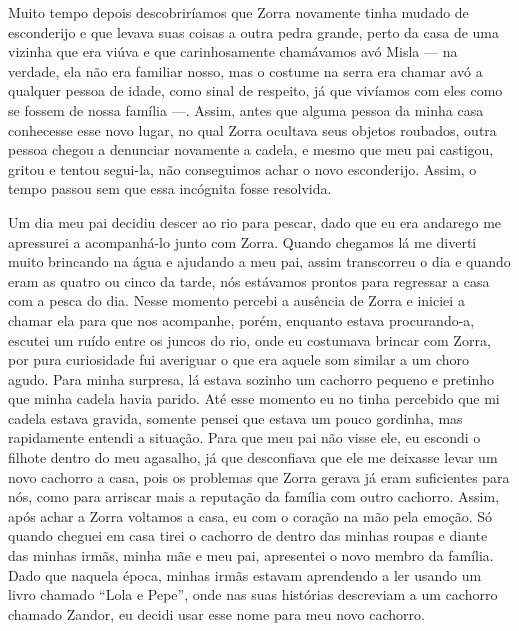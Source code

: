 Muito tempo depois descobriríamos que Zorra novamente tinha mudado de esconderijo e que levava suas coisas a outra pedra grande, perto da casa de uma vizinha que era viúva e que carinhosamente chamávamos avó Misla --- na verdade, ela não era familiar nosso, mas o costume na serra era chamar avó a qualquer pessoa de idade, como sinal de respeito, já que vivíamos com eles como se fossem de nossa família ---.
Assim, antes que alguma pessoa da minha casa conhecesse esse novo lugar, no qual Zorra ocultava seus objetos roubados, outra pessoa chegou a denunciar novamente a cadela, e mesmo que meu pai castigou, gritou e tentou segui-la, não conseguimos achar o novo esconderijo. Assim, o tempo passou sem que essa incógnita fosse resolvida. 

Um dia meu pai decidiu descer ao rio para pescar, dado que eu era andarego me apressurei a acompanhá-lo junto com Zorra. 
Quando chegamos lá me diverti muito brincando na água e ajudando a meu pai, assim transcorreu o dia e quando eram as quatro ou cinco da tarde, nós estávamos prontos para regressar a casa com a pesca do dia.
Nesse momento percebi a ausência de Zorra e iniciei a chamar ela para que nos acompanhe,
porém, enquanto estava procurando-a, escutei um ruído entre os juncos do rio, onde eu costumava brincar com Zorra, por pura curiosidade fui averiguar o que era aquele som similar a um choro agudo. Para minha surpresa, lá estava sozinho um cachorro pequeno e pretinho que minha cadela havia parido.  
Até esse momento eu no tinha percebido que mi cadela estava gravida, somente pensei que estava um pouco gordinha,
mas rapidamente entendi a situação.
Para que meu pai não visse ele, eu escondi o filhote dentro do meu agasalho, já que desconfiava que ele me deixasse levar um novo cachorro a casa, pois os problemas que Zorra gerava já eram suficientes para nós, como para arriscar mais a reputação da família com outro cachorro.
Assim, após achar a Zorra voltamos a casa, eu com o coração na mão pela emoção.
Só quando cheguei em casa tirei o cachorro de dentro das minhas roupas e diante das minhas irmãs, minha mãe e meu pai, apresentei o novo membro da família. Dado que naquela época, minhas irmãs estavam aprendendo a ler usando um livro chamado ``Lola e Pepe'', onde nas suas histórias descreviam a um cachorro chamado Zandor, eu decidi usar esse nome para meu novo cachorro. 

